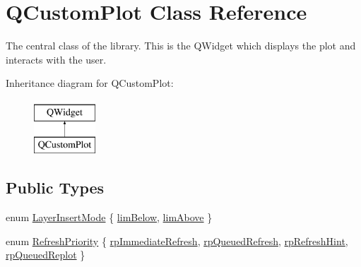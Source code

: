 \hypertarget{class_q_custom_plot}{}\section{Q\+Custom\+Plot Class Reference}
\label{class_q_custom_plot}


The central class of the library. This is the Q\+Widget which displays the plot and interacts with the user.  


Inheritance diagram for Q\+Custom\+Plot\+:\begin{figure}[H]
\begin{center}
\leavevmode
\includegraphics[height=2.000000cm]{class_q_custom_plot}
\end{center}
\end{figure}
\subsection*{Public Types}
\begin{DoxyCompactItemize}
\item 
enum \mbox{\hyperlink{class_q_custom_plot_a75a8afbe6ef333b1f3d47abb25b9add7}{Layer\+Insert\+Mode}} \{ \mbox{\hyperlink{class_q_custom_plot_a75a8afbe6ef333b1f3d47abb25b9add7aee39cf650cd24e68552da0b697ce4a93}{lim\+Below}}, 
\mbox{\hyperlink{class_q_custom_plot_a75a8afbe6ef333b1f3d47abb25b9add7a062b0b7825650b432a713c0df6742d41}{lim\+Above}}
 \}
\item 
enum \mbox{\hyperlink{class_q_custom_plot_a45d61392d13042e712a956d27762aa39}{Refresh\+Priority}} \{ \mbox{\hyperlink{class_q_custom_plot_a45d61392d13042e712a956d27762aa39aa6eda645ccf1a60635df3e8b71ea6ae2}{rp\+Immediate\+Refresh}}, 
\mbox{\hyperlink{class_q_custom_plot_a45d61392d13042e712a956d27762aa39acd6f1e590ea775d1ddee666428077f3e}{rp\+Queued\+Refresh}}, 
\mbox{\hyperlink{class_q_custom_plot_a45d61392d13042e712a956d27762aa39a49666a5854a68dbcca8b277b03331260}{rp\+Refresh\+Hint}}, 
\mbox{\hyperlink{class_q_custom_plot_a45d61392d13042e712a956d27762aa39a019650c6ddf308f97e811fbfff207a8f}{rp\+Queued\+Replot}}
 \}
\end{DoxyCompactItemize}
